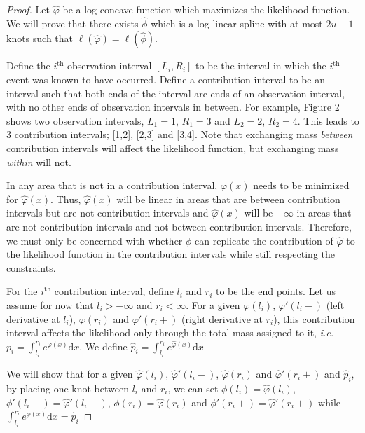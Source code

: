 \documentclass[10pt]{article}
\begin{document}
	\begin{proof}
	
	Let $\hat \varphi$ be a log-concave function which maximizes the likelihood function. We will prove that there exists $\hat \phi$ which is a log linear spline with at most $2u - 1$ knots such that $\ell(\hat \varphi) = \ell(\hat \phi)$.

	Define the $i^{\mathrm{th} } $ observation interval $[L_i, R_i]$ to be the interval in which the $i^{\mathrm{th} } $ event was known to have occurred. Define a contribution interval to be an interval such that both ends of the interval are ends of an observation interval, with no other ends of observation intervals in between. For example, Figure 2 shows two observation intervals, $L_1 = 1$, $R_1 = 3$ and $L_2 = 2$, $R_2 = 4$. This leads to 3 contribution intervals; [1,2], [2,3] and [3,4]. Note that exchanging mass \emph{between} contribution intervals will affect the likelihood function, but exchanging mass \emph{within} will not. 
	
	In any area that is not in a contribution interval, $\varphi(x)$ needs to be minimized for $\hat \varphi(x)$. Thus, $\hat \varphi(x)$ will be linear in areas that are between contribution intervals but are not contribution intervals and $\hat \varphi(x)$ will be $-\infty$ in areas that are not contribution intervals and not between contribution intervals. Therefore, we must only be concerned with whether $\phi$ can replicate the contribution of $\hat \varphi$ to the likelihood function in the contribution intervals while still respecting the constraints.

 	For the $i^{\mathrm{th} } $ contribution interval, define $l_i$ and $r_i$ to be the end points. Let us assume for now that $l_i > -\infty$ and $r_i < \infty$.  For a given $\varphi(l_i)$, $\varphi'(l_i -)$ (left derivative at $l_i$), $\varphi(r_i)$ and $\varphi'(r_i+)$ (right derivative at $r_i$), this contribution interval affects the likelihood only through the total mass assigned to it, \emph{i.e.}\ $p_i = \int_{l_i}^{r_i} e^ {\varphi(x)} \mathrm{d}x$. We define $\hat p_i = \int_{l_i}^{r_i} e^ {\hat \varphi(x)} \mathrm{d}x$
	
	 We will show that for a given $\hat \varphi(l_i)$, $\hat \varphi'(l_i -)$, $\hat \varphi(r_i)$ and $\hat \varphi'(r_i+)$ and $\hat p_i$, by placing one knot between $l_i$ and $r_i$, we can set $\phi(l_i) =\hat \varphi(l_i)$, $\phi'(l_i-) = \hat \varphi'(l_i -)$, $\phi(r_i) = \hat \varphi(r_i)$ and $\phi'(r_i+) = \hat \varphi'(r_i+)$ while $\displaystyle \int_{l_i}^{r_i} e^{\phi(x)} \mathrm{d}x = \hat p_i $
	 

\end{proof}
\end{document}
